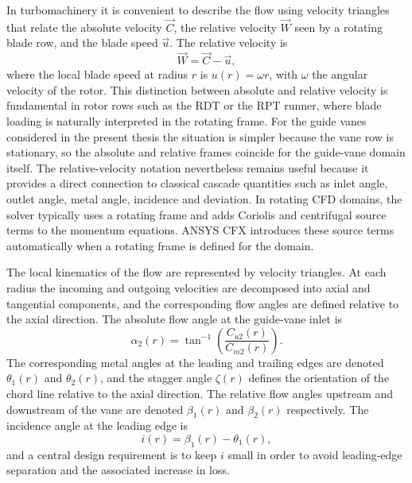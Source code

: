 In turbomachinery it is convenient to describe the flow using velocity triangles that relate the absolute velocity $\vec{C}$, the relative velocity $\vec{W}$ seen by a rotating blade row, and the blade speed $\vec{u}$. The relative velocity is
\begin{equation}
\vec{W} = \vec{C} - \vec{u},
\label{eq:relative_velocity}
\end{equation}
where the local blade speed at radius $r$ is $u(r) = \omega r$, with $\omega$ the angular velocity of the rotor. This distinction between absolute and relative velocity is fundamental in rotor rows such as the RDT or the RPT runner, where blade loading is naturally interpreted in the rotating frame. For the guide vanes considered in the present thesis the situation is simpler because the vane row is stationary, so the absolute and relative frames coincide for the guide-vane domain itself. The relative-velocity notation nevertheless remains useful because it provides a direct connection to classical cascade quantities such as inlet angle, outlet angle, metal angle, incidence and deviation. In rotating CFD domains, the solver typically uses a rotating frame and adds Coriolis and centrifugal source terms to the momentum equations. ANSYS CFX introduces these source terms automatically when a rotating frame is defined for the domain.

The local kinematics of the flow are represented by velocity triangles. At each radius the incoming and outgoing velocities are decomposed into axial and tangential components, and the corresponding flow angles are defined relative to the axial direction. The absolute flow angle at the guide-vane inlet is
\begin{equation}
\alpha_2(r) = \tan^{-1}\!\left(\frac{C_{u2}(r)}{C_{m2}(r)}\right).
\label{eq:alpha_inlet}
\end{equation}
The corresponding metal angles at the leading and trailing edges are denoted $\theta_1(r)$ and $\theta_2(r)$, and the stagger angle $\zeta(r)$ defines the orientation of the chord line relative to the axial direction. The relative flow angles upstream and downstream of the vane are denoted $\beta_1(r)$ and $\beta_2(r)$ respectively. The incidence angle at the leading edge is
\begin{equation}
i(r) = \beta_1(r) - \theta_1(r),
\label{eq:incidence}
\end{equation}
and a central design requirement is to keep $i$ small in order to avoid leading-edge separation and the associated increase in loss.

